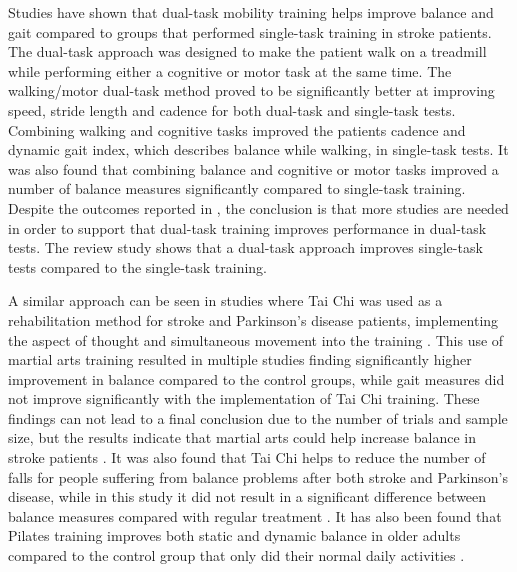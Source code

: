 Studies have shown that dual-task mobility training helps improve balance and gait compared to groups that performed single-task training in stroke patients. The dual-task approach was designed to make the patient walk on a treadmill while performing either a cognitive or motor task at the same time. \cite{He2018}
The walking/motor dual-task method proved to be significantly better at improving speed, stride length and cadence for both dual-task and single-task tests. Combining walking and cognitive tasks improved the patients cadence and dynamic gait index, which describes balance while walking, in single-task tests. It was also found that combining balance and cognitive or motor tasks improved a number of balance measures significantly compared to single-task training. \cite{He2018}
Despite the outcomes reported in \cite{He2018}, the conclusion is that more studies are needed in order to support that dual-task training improves performance in dual-task tests. The review study shows that a dual-task approach improves single-task tests compared to the single-task training. \cite{He2018}

A similar approach can be seen in studies where Tai Chi was used as a rehabilitation method for stroke and Parkinson's disease patients, implementing the aspect of thought and simultaneous movement into the training \cite{Ding2012,Winser2018}. This use of martial arts training resulted in multiple studies finding significantly higher improvement in balance compared to the control groups, while gait measures did not improve significantly with the implementation of Tai Chi training. \cite{Ding2012}
These findings can not lead to a final conclusion due to the number of trials and sample size, but the results indicate that martial arts could help increase balance in stroke patients \cite{Ding2012}. It was also found that Tai Chi helps to reduce the number of falls for people suffering from balance problems after both stroke and Parkinson's disease, while in this study it did not result in a significant difference between balance measures compared with regular treatment \cite{Winser2018}. It has also been found that Pilates training improves both static and dynamic balance in older adults compared to the control group that only did their normal daily activities \cite{Moreno2017}.


